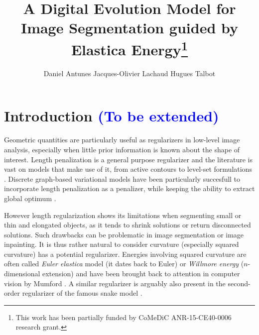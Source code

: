 \documentclass[runningheads]{llncs}
\newcommand{\todo}[1]{{\textcolor{blue}{#1}}}
\newcommand{\jaco}[1]{{\textcolor{green!50!black}{#1}}}
\begin{document}
%
\title{\jaco{A Digital Evolution Model for Image Segmentation guided by Elastica Energy}\thanks{This  work has  been  partially  funded by CoMeDiC ANR-15-CE40-0006 research grant.}}

\author{Daniel Antunes
Jacques-Olivier Lachaud
Hugues Talbot}
%
%
%
\maketitle              %
%
\begin{abstract}

 
\end{abstract}
%
%
%
\setcounter{footnote}{0}
\section{Introduction \todo{(To be extended)}}


Geometric quantities are particularly useful as regularizers in
low-level image analysis, especially when little prior information is
known about the shape of interest. Length penalization is a general
purpose regularizer and the literature is vast on models that make use
of it, from active contours \cite{casseles97geodesic} to level-set
formulations \cite{malladi1995image,malladi1995shape}. Discrete
graph-based variational models have been particularly succesfull to
incorporate length penalization as a penalizer, while keeping the
ability to extract global optimum
\cite{boykov01graphcut,appleton05geodesic}.

However length regularization shows its limitations when segmenting
small or thin and elongated objects, as it tends to shrink solutions
or return disconnected solutions. Such drawbacks can be problematic in
image segmentation or image inpainting. It is thus rather natural to
consider curvature (especially squared curvature) has a potential
regularizer. Energies involving squared curvature are often called
{\em Euler elastica} model (it dates back to Euler) or {\em Willmore energy}
($n$-dimensional extension) and have been brought back to attention in
computer vision by Mumford \cite{mumford1994elastica}. A similar
regularizer is arguably also present in the second-order regularizer
of the famous snake model \cite{kass1988snakes}.
\end{document}
